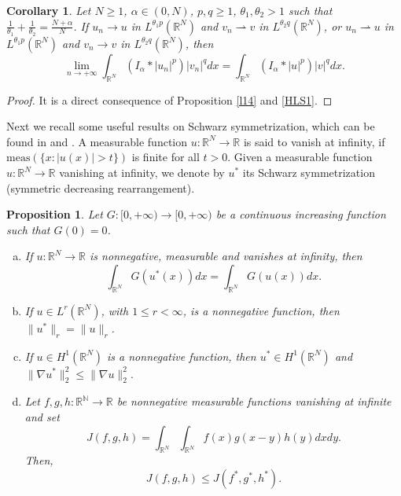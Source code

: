 \documentclass[12pt,a4paper]{article}
\newtheorem{proposition}[theorem]{Proposition}
\newtheorem{corollary}[theorem]{Corollary}
\numberwithin{equation}{section}
\begin{document}
\begin{corollary}\label{c4}
Let $N \geq 1$, $\alpha \in (0, N)$, $p, q \geq 1$, $\theta_1, \theta_2>1$ such that $\frac{1}{\theta_1}+ \frac{1}{\theta_2} = \frac{N+\alpha}{N}$. If $u_{n} \rightarrow u$ in $L^{\theta_1 p}(\mathbb{R}^N)$ and $v_{n} \rightharpoonup v$ in $L^{\theta_2 q}(\mathbb{R}^N)$, or $u_{n} \rightharpoonup u$ in $L^{\theta_1 p}(\mathbb{R}^N)$ and $v_{n} \rightarrow v$ in $L^{\theta_2 q}(\mathbb{R}^N)$, then
$$
\lim\limits_{n\rightarrow +\infty} \int_{\mathbb{R}^N} (I_\alpha \ast |u_{n}|^p)|v_{n}|^q dx = \int_{\mathbb{R}^N} (I_\alpha \ast |u|^p)|v|^q dx.
$$
\end{corollary}
\begin{proof}
It is a direct consequence of Proposition \ref{l14} and \eqref{HLS1}.
\end{proof}



Next we recall some useful results on Schwarz symmetrization, which can be found in \cite[Section 3 in Chapter 6]{Kavian1993} and \cite[Chapter 3]{Lieb2001}. A measurable function $u:\mathbb{R}^N \to \mathbb{R}$ is said to vanish at infinity, if $\textrm{meas}(\{ x: |u(x)|>t\})$ is finite for all  $t>0$. Given a measurable function $u:\mathbb{R}^N \to \mathbb{R}$ vanishing at infinity, we denote by $u^\ast$ its Schwarz symmetrization (symmetric decreasing rearrangement). 


\begin{proposition}\label{t8} Let $G:[0, +\infty)\rightarrow [0, +\infty)$ be a continuous increasing function such that $G(0)=0$.
\begin{enumerate}[(a)]
\item If $u:\mathbb{R}^N \to \mathbb{R}$ is nonnegative, measurable and vanishes at infinity, then 
$$
\int_{\mathbb{R}^N} G(u^\ast(x)) dx = \int_{\mathbb{R}^N} G(u(x)) dx.
$$
\item If $u \in L^r(\mathbb{R}^N)$, with $1 \leq r < \infty$, is a nonnegative function, then  $\|u^\ast\|_r = \|u\|_r$.
\item If $u\in H^{1}(\mathbb{R}^N)$ is a nonnegative function, then $u^\ast \in H^{1}(\mathbb{R}^N)$ and
$
\|\nabla u^\ast\|_{2}^{2} \leq \|\nabla u\|_{2}^{2}.
$
\item Let $f, g, h: \mathbb{R^N} \to \mathbb{R}$ be nonnegative measurable functions vanishing at infinite and set
\[
J(f, g, h) = \int_{\mathbb{R}^N} \int_{\mathbb{R}^N} f(x)g(x-y)h(y) dx dy.
\]
Then,
\[
J(f, g, h) \leq J(f^\ast, g^\ast, h^\ast).
\]
\end{enumerate}

\end{proposition}
\end{document}
